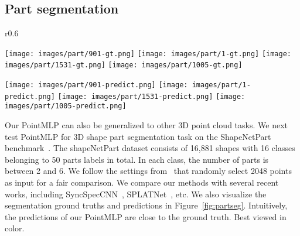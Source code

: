 \documentclass{article} \usepackage{iclr2022_conference,times}
\begin{document}
\subsection{Part segmentation}
\begin{wrapfigure}{r}{0.6\textwidth}
  \vspace{-7mm}
  \begin{center}
    \texttt{[image: images/part/901-gt.png]}
    \texttt{[image: images/part/1-gt.png]}
    \texttt{[image: images/part/1531-gt.png]}
    \texttt{[image: images/part/1005-gt.png]}
    
    
    \texttt{[image: images/part/901-predict.png]}
     \texttt{[image: images/part/1-predict.png]}
    \texttt{[image: images/part/1531-predict.png]}
    \texttt{[image: images/part/1005-predict.png]}
  \end{center}
  \vspace{-2mm}
  \caption{Part segmentation results on ShapeNetPart. Top line is ground truth and bottom line is our prediction.}
  \label{fig:partseg}
  \vspace{-2mm}
\end{wrapfigure}
Our PointMLP can also be generalized to other 3D point cloud tasks. We next test PointMLP for 3D shape part segmentation task on the ShapeNetPart benchmark~\citep{yi2016scalable}. 
The shapeNetPart dataset consists of 16,881 shapes with 16 classes belonging to 50  parts labels in total. In each class, the number of parts is between 2 and 6. We follow the settings from~\citet{qi2017pointnet++} that randomly select 2048 points as input for a fair comparison. We compare our methods with several recent works, including SyncSpecCNN~\citep{yi2017syncspeccnn}, SPLATNet~\citep{su2018splatnet},  etc. 
We also visualize the segmentation ground truths and predictions in Figure~\ref{fig:partseg}. Intuitively, the predictions of our PointMLP are close to the ground truth. Best viewed in color.
\end{document}
